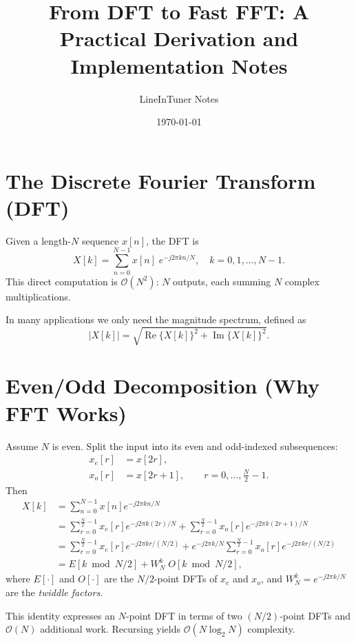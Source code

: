 \documentclass[11pt,a4paper]{article}
\title{From DFT to Fast FFT: A Practical Derivation and Implementation Notes}
\author{LineInTuner Notes}
\date{\today}
\begin{document}
\maketitle

\section{The Discrete Fourier Transform (DFT)}
Given a length-$N$ sequence $x[n]$, the DFT is
\begin{equation}
X[k] = \sum_{n=0}^{N-1} x[n] \; e^{-j 2\pi k n / N}, \quad k=0,1,\dots,N-1.
\end{equation}
This direct computation is $\mathcal{O}(N^2)$: $N$ outputs, each summing $N$ complex multiplications.

In many applications we only need the magnitude spectrum, defined as
\begin{equation}
  \left|X[k]\right| = \sqrt{\operatorname{Re}\{X[k]\}^2 + \operatorname{Im}\{X[k]\}^2}.
\end{equation}

\section{Even/Odd Decomposition (Why FFT Works)}
Assume $N$ is even. Split the input into its even and odd-indexed subsequences:
\begin{align}
 x_e[r] &= x[2r], \\[-0.25em]
 x_o[r] &= x[2r+1], \qquad r=0,\dots,\frac{N}{2}-1.
\end{align}
Then
\begin{align}
X[k]
&= \sum_{n=0}^{N-1} x[n] e^{-j 2\pi k n / N} \\
&= \sum_{r=0}^{\frac{N}{2}-1} x_e[r] e^{-j 2\pi k (2r)/N}
  + \sum_{r=0}^{\frac{N}{2}-1} x_o[r] e^{-j 2\pi k (2r+1)/N} \\
&= \sum_{r=0}^{\frac{N}{2}-1} x_e[r] e^{-j 2\pi k r /(N/2)}
  + e^{-j 2\pi k/N} \sum_{r=0}^{\frac{N}{2}-1} x_o[r] e^{-j 2\pi k r /(N/2)} \\
&= E[k \bmod N/2] + W_N^k \; O[k \bmod N/2],
\end{align}
where $E[\cdot]$ and $O[\cdot]$ are the $N/2$-point DFTs of $x_e$ and $x_o$, and $W_N^k = e^{-j 2\pi k/N}$ are the \emph{twiddle factors}.

This identity expresses an $N$-point DFT in terms of two $(N/2)$-point DFTs and $\mathcal{O}(N)$ additional work. Recursing yields $\mathcal{O}(N \log_2 N)$ complexity.
\end{document}
